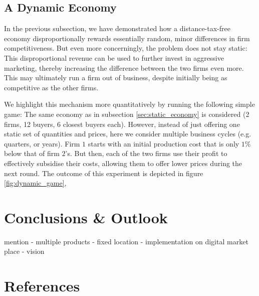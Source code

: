 \documentclass[final,3p,times,authoryear,12pt]{elsarticle}
\newcommand{\red}[1]{\textcolor{WildStrawberry}{#1}} %
\begin{document}
\subsection{A Dynamic Economy} 

In the previous subsection, we have demonstrated how a distance-tax-free economy disproportionally rewards essentially random, minor differences in firm competitiveness. 
But even more concerningly, the problem does not stay static: 
This disproportional revenue can be used to further invest in aggressive marketing, thereby increasing the difference between the two firms even more. 
This may ultimately run a firm out of business, despite initially being as competitive as the other firms. 

We highlight this mechanism more quantitatively by running the following simple game:
The same economy as in subsection \ref{sec:static_economy} is considered (2 firms, 12 buyers, 6 closest buyers each). 
However, instead of just offering one static set of quantities and prices, here we consider multiple business cycles (e.g. quarters, or years). 
Firm $1$ starts with an initial production cost that is only $1\%$ below that of firm $2$'s. 
But then, each of the two firms use their profit to effectively subsidise their costs, allowing them to offer lower prices during the next round. 
The outcome of this experiment is depicted in figure \ref{fig:dynamic_game}, 


\section{Conclusions \& Outlook}
\label{sec:conclusions} 

\red{
mention
- multiple products
- fixed location
- implementation on digital market place
- vision
} 

\section*{References}


\end{document}
